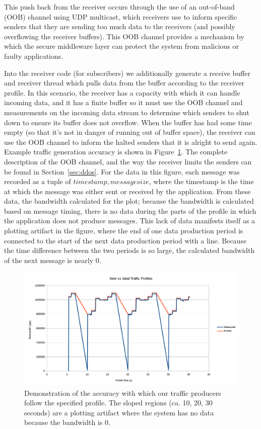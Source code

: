 This push back from the receiver occurs through the use of an
out-of-band (OOB) channel using UDP multicast, which receivers use to
inform specific senders that they are sending too much data to the
receivers (and possibly overflowing the receiver buffers).  This OOB
channel provides a mechanism by which the secure middleware layer can
protect the system from malicious or faulty applications.

Into the receiver code (for subscribers) we additionally generate a
receive buffer and receiver thread which pulls data from the buffer
according to the receiver profile.  In this scenario, the receiver has
a capacity with which it can handle incoming data, and it has a finite
buffer so it must use the OOB channel and measurements on the incoming
data stream to determine which senders to shut down to ensure its
buffer does not overflow.  When the buffer has had some time empty (so
that it's not in danger of running out of buffer space), the receiver
can use the OOB channel to inform the halted senders that it is
alright to send again.  Example traffic generation accuracy is shown
in Figure~\ref{fig:generation}.  The complete description of the OOB
channel, and the way the receiver limits the senders can be found in
Section~\ref{sec:ddos}.  For the data in this figure, each message was
recorded as a tuple of $timestamp, message size$, where the timestamp
is the time at which the message was either sent or received by the
application.  From these data, the bandwidth calculated for the
plot; because the bandwidth is calculated based on message timing,
there is no data during the parts of the profile in which the
application does not produce messages.  This lack of data manifests
itself as a plotting artifact in the figure, where the end of one data
production period is connected to the start of the next data
production period with a line.  Because the time difference between
the two periods is so large, the calculated bandwidth of the next
message is nearly 0.  

\begin{figure}[ht!]
  \includegraphics[width=1.1\textwidth]{../doc/src/images/results/traffic_generation.png}
  \caption{Demonstration of the accuracy with which our traffic
    producers follow the specified profile.  The sloped regions
    (ca. 10, 20, 30 seconds) are a plotting artifact where the system
    has no data because the bandwidth is 0.}
  \label{fig:generation}
\end{figure}

